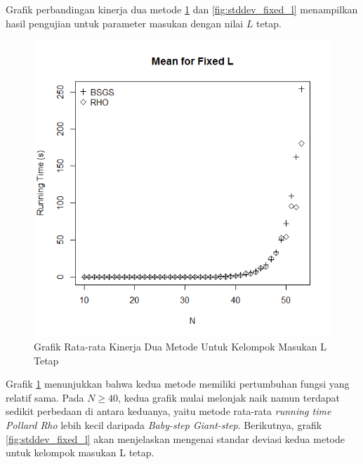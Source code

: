 Grafik perbandingan kinerja dua metode \ref{fig:mean_fixed_l} dan \ref{fig:stddev_fixed_l} menampilkan hasil pengujian untuk parameter masukan dengan nilai $ L $ tetap.

\begin{figure}[h!]
	\Centering
	\includegraphics[angle=0, scale=0.55]{bab5/img/mean-fixed-l}
	\caption{Grafik Rata-rata Kinerja Dua Metode Untuk Kelompok Masukan L Tetap}
	\label{fig:mean_fixed_l}
\end{figure}

Grafik \ref{fig:mean_fixed_l} menunjukkan bahwa kedua metode memiliki pertumbuhan fungsi yang relatif sama. Pada $ N \geq 40 $, kedua grafik mulai melonjak naik namun terdapat sedikit perbedaan di antara keduanya, yaitu metode rata-rata \textit{running time} \textit{Pollard Rho} lebih kecil daripada \textit{Baby-step Giant-step}. Berikutnya, grafik \ref{fig:stddev_fixed_l} akan menjelaskan mengenai standar deviasi kedua metode untuk kelompok masukan L tetap.

